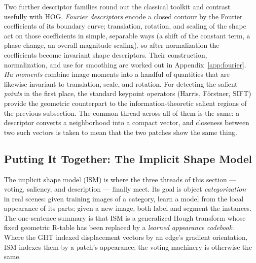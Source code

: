 Two further descriptor families round out the classical toolkit and contrast
usefully with HOG. \emph{Fourier descriptors} encode a closed contour by the
Fourier coefficients of its boundary curve; translation, rotation, and scaling of
the shape act on those coefficients in simple, separable ways (a shift of the
constant term, a phase change, an overall magnitude scaling), so after
normalization the coefficients become invariant shape descriptors. Their
construction, normalization, and use for smoothing are worked out in
Appendix~\ref{app:fourier}. \emph{Hu
moments} combine image moments into a handful of quantities that are likewise
invariant to translation, scale, and rotation. For detecting the salient
\emph{points} in the first place, the standard keypoint operators (Harris,
Förstner, SIFT) provide the geometric counterpart to the information-theoretic
salient regions of the previous subsection. The common thread across all of them
is the same: a descriptor converts a neighborhood into a compact vector, and
closeness between two such vectors is taken to mean that the two patches show the
same thing.

\subsection{Putting It Together: The Implicit Shape Model}

The implicit shape model (ISM) is where the three threads of this section ---
voting, saliency, and description --- finally meet. Its goal is object
\emph{categorization} in real scenes: given training images of a category, learn a
model from the local appearance of its parts; given a new image, both label and
segment the instances. The one-sentence summary is that ISM is a generalized
Hough transform whose fixed geometric R-table has been replaced by a \emph{learned
appearance codebook}. Where the GHT indexed displacement vectors by an edge's
gradient orientation, ISM indexes them by a patch's appearance; the voting
machinery is otherwise the same.

